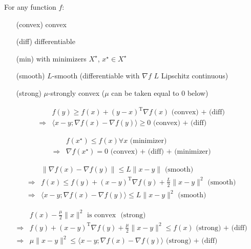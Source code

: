 \documentclass[a4paper,twoside,10pt]{amsart}
\numberwithin{equation}{section} %
\numberwithin{figure}{section} %
\numberwithin{table}{section} %
\theoremstyle{definition}
\begin{document}
\begin{tcolorbox}[width=\textwidth,colback={blue!5!white},title={\textbf{Optimization inequalities cheatsheet}},colbacktitle=black,coltitle=white]    
For any function $f$:
\begin{itemize}
\item[(convex)] convex
\item[(diff)] differentiable
\item[(min)] with minimizers $X^\star$, $x^\star \in X^\star$
\item[(smooth)] $L$-smooth (differentiable with $\nabla f$ $L$ Lipschitz continuous)
\item[(strong)] $\mu$-strongly convex ($\mu$ can be taken equal to $0$ below)
\end{itemize}


\begin{align*}
& f(y) \geq f(x) + (y-x)^\mathrm{T} \nabla f(x)  \text{ (convex) + (diff) } \\
\Rightarrow &\langle x-y  ;  \nabla f(x)-\nabla f(y)\rangle\geq0   \text{ (convex) + (diff) } 
\end{align*}

\begin{align*}
&  f(x^\star) \leq f(x) \forall x  \text{ (minimizer) } \\
\Rightarrow & \nabla f(x^\star) = 0  \text{ (convex) + (diff) + (minimizer) }
\end{align*}


\begin{align*}
&  \|\nabla f(x) - \nabla f(y) \| \leq L \|x-y\|  \text{ (smooth) } \\
\Rightarrow & f(x) \leq f(y) +  (x-y)^\mathrm{T} \nabla f(y)  + \frac{L}{2} \| x-y\|^2  \text{ (smooth) } \\
\Rightarrow  & \langle x-y  ;  \nabla f(x)-\nabla f(y)\rangle \leq L \|x-y\|^2  \text{ (smooth) }
\end{align*}



\begin{align*}
&  f(x) - \frac{\mu}{2}\|x\|^2 \text{ is convex  }  \text{ (strong) } \\
\Rightarrow & f(y) +  (x-y)^\mathrm{T} \nabla f(y)  + \frac{\mu}{2} \| x-y\|^2 \leq f(x)  \text{ (strong) + (diff) } \\
\Rightarrow  & \mu \|x-y\|^2 \leq  \langle x-y  ;  \nabla f(x)-\nabla f(y)\rangle   \text{ (strong) + (diff) }
\end{align*}



\end{tcolorbox}
\end{document}
